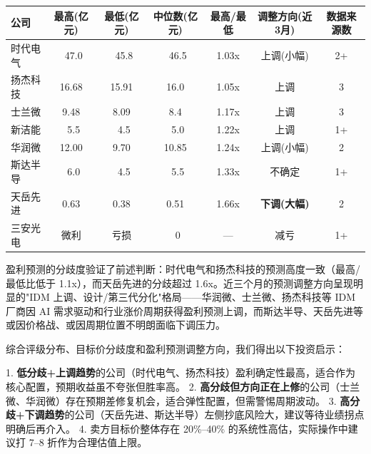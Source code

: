 \begin{exhibitbox}[表 7-5：2026E 盈利预测对比与机构分歧]
\centering
\small
\begin{tabularx}{\textwidth}{l c c c c c c}
\toprule
\textbf{公司} & \textbf{最高(亿元)} & \textbf{最低(亿元)} & \textbf{中位数(亿元)} & \textbf{最高/最低} & \textbf{调整方向(近3月)} & \textbf{数据来源数} \\
\midrule
\rowcolor{riskgreen!10}
时代电气 & ~47.0 & ~45.8 & ~46.5 & 1.03x & 上调(小幅) & 2+ \\
\rowcolor{riskgreen!10}
扬杰科技 & 16.68 & 15.91 & 16.0 & 1.05x & 上调 & 3 \\
\rowcolor{riskamber!10}
士兰微 & 9.48 & 8.09 & 8.4 & 1.17x & 上调 & 3 \\
\rowcolor{riskamber!10}
新洁能 & ~5.5 & ~4.5 & ~5.0 & 1.22x & 上调 & 1+ \\
\rowcolor{riskamber!10}
华润微 & 12.00 & 9.70 & 10.85 & 1.24x & 上调(小幅) & 2 \\
\rowcolor{riskamber!10}
斯达半导 & ~6.0 & ~4.5 & ~5.5 & 1.33x & 不确定 & 1+ \\
\rowcolor{riskred!10}
天岳先进 & 0.63 & 0.38 & 0.51 & 1.66x & \textbf{下调(大幅)} & 2 \\
\rowcolor{steelgrey!10}
三安光电 & 微利 & 亏损 & ~0 & — & 减亏 & 1+ \\
\bottomrule
\end{tabularx}
\end{exhibitbox}

盈利预测的分歧度验证了前述判断：时代电气和扬杰科技的预测高度一致（最高/最低比低于 1.1x），而天岳先进的分歧超过 1.6x。近三个月的预测调整方向呈现明显的"IDM 上调、设计/第三代分化"格局——华润微、士兰微、扬杰科技等 IDM 厂商因 AI 需求驱动和行业涨价周期获得盈利预测上调，而斯达半导、天岳先进等或因价格战、或因周期位置不明朗面临下调压力。

\begin{keyinsight}[机构预期的投资含义]
综合评级分布、目标价分歧度和盈利预测调整方向，我们得出以下投资启示：

1. \textbf{低分歧+上调趋势}的公司（时代电气、扬杰科技）盈利确定性最高，适合作为核心配置，预期收益虽不夸张但胜率高。
2. \textbf{高分歧但方向正在上修}的公司（士兰微、华润微）存在预期差修复机会，适合弹性配置，但需警惕周期波动。
3. \textbf{高分歧+下调趋势}的公司（天岳先进、斯达半导）左侧抄底风险大，建议等待业绩拐点明确后再介入。
4. 卖方目标价整体存在 20\%–40\% 的系统性高估，实际操作中建议打 7–8 折作为合理估值上限。
\end{keyinsight}

